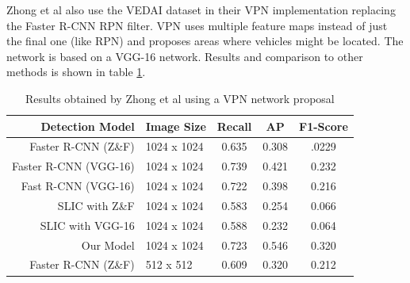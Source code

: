 \documentclass{IEEEtran}
\begin{document}
Zhong et al \cite{Zhong2017} also use the VEDAI dataset \cite{razakarivony2016vehicle} in their VPN implementation replacing the Faster R-CNN RPN filter. VPN uses multiple feature maps instead of just the final one (like RPN) and proposes areas where vehicles might be located. The network is based on a VGG-16 network. Results and comparison to other methods is shown in table \ref{zhongtable}.

\begin{table}[ht]
\centering
\caption{Results obtained by Zhong et al \cite{Zhong2017} using a VPN network proposal}
\label{zhongtable}
\begin{tabular}{rlccc}
\hline
\multicolumn{1}{|r|}{\textbf{Detection Model}} & \multicolumn{1}{l|}{\textbf{Image Size}} & \multicolumn{1}{c|}{\textbf{Recall}} & \multicolumn{1}{c|}{\textbf{AP}} & \multicolumn{1}{c|}{\textbf{F1-Score}} \\ \hline
Faster R-CNN (Z\&F)                            & 1024 x 1024                              & 0.635                                & 0.308                            & .0229                                  \\
Faster R-CNN (VGG-16)                          & 1024 x 1024                              & 0.739                                & 0.421                            & 0.232                                  \\
Fast R-CNN (VGG-16)                            & 1024 x 1024                              & 0.722                                & 0.398                            & 0.216                                  \\
SLIC with Z\&F                                 & 1024 x 1024                              & 0.583                                & 0.254                            & 0.066                                  \\
SLIC with VGG-16                               & 1024 x 1024                              & 0.588                                & 0.232                            & 0.064                                  \\
Our Model                                      & 1024 x 1024                              & 0.723                                & 0.546                            & 0.320                                  \\
Faster R-CNN (Z\&F)                            & 512 x 512                                & 0.609                                & 0.320                            & 0.212                                  \\

\end{tabular}
\end{table}
\end{document}
